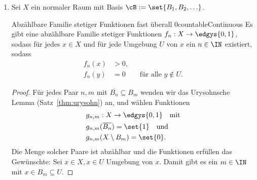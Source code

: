 \documentclass[language=ngerman]{TemplateLecture} %
\begin{document}
\begin{enumerate}
\begin{proof}
        Umgekehrt sei $V \subseteq \prod_\IN \IR$ offen bezüglich der Produkttopologie, $x \in V$. Dann gibt es $V_1, \ldots, V_n \subseteq \IR$ offen mit 
        \begin{equation*}
            x \in V_1 \times \cdots \times V_n \times \IR \times \IR \times \cdots \quad \subseteq V.
        \end{equation*}
        Für $i = 1, \ldots, n$ sei $\varepsilon_i > 0$ mit $\rounds{x_i - \varepsilon_i, x_i + \varepsilon_i} \subseteq V_i$. Setze $\varepsilon := \min\set{\frac{\varepsilon_i}{i} \mid i = 1,\ldots,n}$. Dann ist 
        \begin{equation*}
            \frac{\abs{y_i - x_i}}{i} \leq D(x, y) < \frac{\varepsilon_i}{i} \quad \quad \text{für alle $i = 1,\ldots,n$}.
        \end{equation*}
        Damit folgt $\abs{y_i - x_i} < \varepsilon_i \Rightarrow y_i \in V_i$ für $i = 1, \ldots, n$, also folgt 
        \begin{equation*}
            y \in V_1 \times \cdots \times V_n \times \IR \times \IR \times \cdots \quad \subseteq V,
        \end{equation*}
        also $U_D(x, \varepsilon) \subseteq V$. Damit ist $V$ offen in der metrischen Topologie.
    \end{proof}
    \item Sei $X$ ein normaler Raum mit Basis $\cB := \set{B_1, B_2, \ldots}$.
    
    \begin{lem}{Abzählbare Familie stetiger Funktionen fast überall 0}{countableContinuous}
        Es gibt eine abzählbare Familie stetiger Funktionen $f_n: X \to \edgys{0,1}$, sodass für jedes $x \in X$ und für jede Umgebung $U$ von $x$ ein $n \in \IN$ existiert, sodass 
        \begin{align*}
            f_n(x) &> 0, \\
            f_n(y) &= 0 \quad \quad \text{für alle $y \notin U$}.
        \end{align*}
    \end{lem}
    \begin{proof}
        Für jedes Paar $n, m$ mit $\overline{B_n} \subseteq B_m$ wenden wir das Urysohnsche Lemma (Satz~\ref{thm:urysohn}) an, und wählen Funktionen
        \begin{align*}
            g_{n,m}&: X \to \edgys{0,1} \quad \text{mit} \\
            g_{n,m}&(\overline{B_n}) = \set{1} \quad \text{und} \\
            g_{n,m}&(X \setminus B_m) = \set{0}.
        \end{align*}
        Die Menge solcher Paare ist abzählbar und die Funktionen erfüllen das Gewünschte: Sei $x \in X, x \in U$ Umgebung von $x$. Damit gibt es ein $m \in \IN$ mit $x \in B_m \subseteq U$.


\end{proof}
\end{enumerate}
\end{document}
